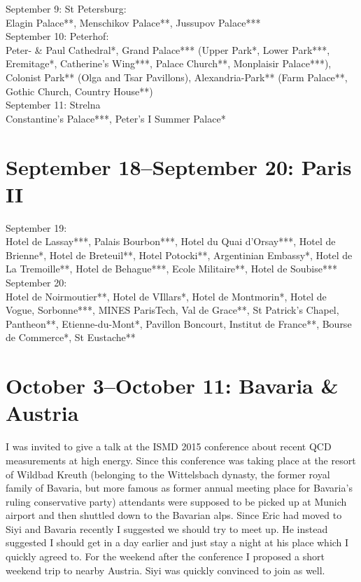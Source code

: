 September 9: St Petersburg:\\
Elagin Palace**, Menschikov Palace**, Jussupov Palace***\\

September 10: Peterhof:\\
Peter- \& Paul Cathedral*, Grand Palace*** (Upper Park*, Lower Park***, Eremitage*, Catherine's Wing***, Palace Church**, Monplaisir Palace***), Colonist Park** (Olga and Tsar Pavillons), Alexandria-Park** (Farm Palace**, Gothic Church, Country House**)\\

September 11: Strelna\\
Constantine's Palace***, Peter's I Summer Palace*

\section{September 18--September 20: Paris II}
\label{2015ParisII}

September 19:\\
Hotel de Lassay***, Palais Bourbon***, Hotel du Quai d'Orsay***, Hotel de Brienne*, Hotel de Breteuil**, Hotel Potocki**, Argentinian Embassy*, Hotel de La Tremoille**, Hotel de Behague***, Ecole Militaire**, Hotel de Soubise***\\

September 20:\\
Hotel de Noirmoutier**, Hotel de VIllars*, Hotel de Montmorin*, Hotel de Vogue, Sorbonne***, MINES ParisTech, Val de Grace**, St Patrick's Chapel, Pantheon**, Etienne-du-Mont*, Pavillon Boncourt, Institut de France**, Bourse de Commerce*, St Eustache**

\section{October 3--October 11: Bavaria \& Austria}
\label{Bavaria2015}

I was invited to give a talk at the ISMD 2015 conference about recent QCD measurements at high energy. Since this conference was taking place at the resort of Wildbad Kreuth (belonging to the Wittelsbach dynasty, the former royal family of Bavaria, but more famous as former annual meeting place for Bavaria's ruling conservative party) attendants were supposed to be picked up at Munich airport and then shuttled down to the Bavarian alps. Since Eric had moved to Siyi and Bavaria recently I suggested we should try to meet up. He instead suggested I should get in a day earlier and just stay a night at his place which I quickly agreed to. For the weekend after the conference I proposed a short weekend trip to nearby Austria. Siyi was quickly convinced to join as well.\\


